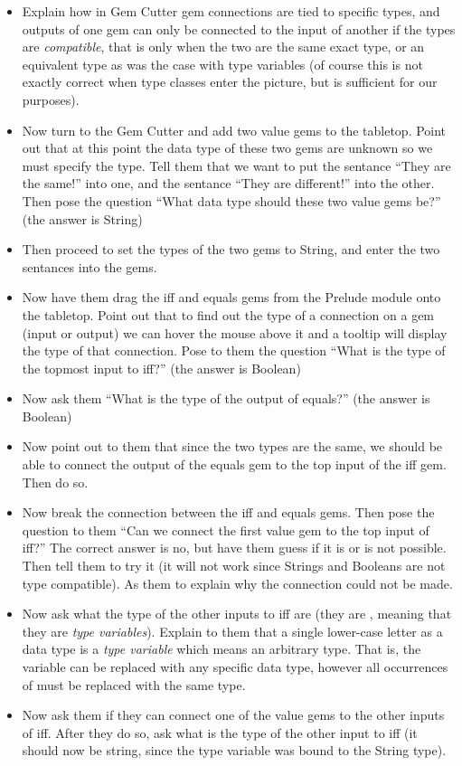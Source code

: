 {\begin{itemize}
			\item Explain how in Gem Cutter gem connections are tied to specific types, and outputs of one gem can only be connected to the input of another if the types are \emph{compatible}, that is only when the two are the same exact type, or an equivalent type as was the case with type variables (of course this is not exactly correct when type classes enter the picture, but is sufficient for our purposes).
			\item Now turn to the Gem Cutter and add two value gems to the tabletop.  Point out that at this point the data type of these two gems are unknown so we must specify the type.  Tell them that we want to put the sentance ``They are the same!'' into one, and the sentance ``They are different!'' into the other.  Then pose the question ``What data type should these two value gems be?'' (the answer is String)
			\item Then proceed to set the types of the two gems to String, and enter the two sentances into the gems.
			\item Now have them drag the iff and equals gems from the Prelude module onto the tabletop.  Point out that to find out the type of a connection on a gem (input or output) we can hover the mouse above it and a tooltip will display the type of that connection.  Pose to them the question ``What is the type of the topmost input to iff?'' (the answer is Boolean)
			\item Now ask them ``What is the type of the output of equals?'' (the answer is Boolean)
			\item Now point out to them that since the two types are the same, we should be able to connect the output of the equals gem to the top input of the iff gem.  Then do so.
			\item Now break the connection between the iff and equals gems.  Then pose the question to them ``Can we connect the first value gem to the top input of iff?''  The correct answer is no, but have them guess if it is or is not possible.  Then tell them to try it (it will not work since Strings and Booleans are not type compatible).  As them to explain why the connection could not be made.
			\item Now ask what the type of the other inputs to iff are (they are , meaning that they are \emph{type variables}).  Explain to them that a single lower-case letter as a data type is a \emph{type variable} which means an arbitrary type.  That is, the variable  can be replaced with any specific data type, however all occurrences of  must be replaced with the same type.
			\item Now ask them if they can connect one of the value gems to the other inputs of iff.  After they do so, ask what is the type of the other input to iff (it should now be string, since the type variable was bound to the String type).
		\end{itemize}

}
